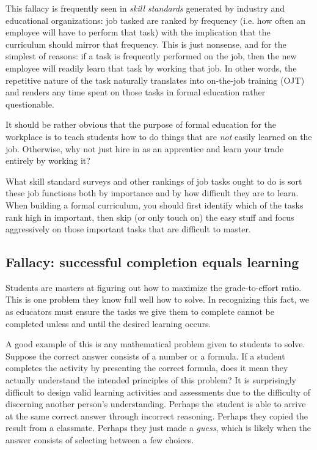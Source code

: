 This fallacy is frequently seen in \textit{skill standards} generated by industry and educational organizations: job tasked are ranked by frequency (i.e. how often an employee will have to perform that task) with the implication that the curriculum should mirror that frequency.  This is just nonsense, and for the simplest of reasons: if a task is frequently performed on the job, then the new employee will readily learn that task by working that job.  In other words, the repetitive nature of the task naturally translates into on-the-job training (OJT) and renders any time spent on those tasks in formal education rather questionable.    

It should be rather obvious that the purpose of formal education for the workplace is to teach students how to do things that are \textit{not} easily learned on the job.  Otherwise, why not just hire in as an apprentice and learn your trade entirely by working it?

\vskip 10pt

What skill standard surveys and other rankings of job tasks ought to do is sort these job functions both by importance and by how difficult they are to learn.  When building a formal curriculum, you should first identify which of the tasks rank high in important, then skip (or only touch on) the easy stuff and focus aggressively on those important tasks that are difficult to master.







\subsection{Fallacy: successful completion equals learning}

Students are masters at figuring out how to maximize the grade-to-effort ratio.  This is one problem they know full well how to solve.  In recognizing this fact, we as educators must ensure the tasks we give them to complete cannot be completed unless and until the desired learning occurs.

A good example of this is any mathematical problem given to students to solve.  Suppose the correct answer consists of a number or a formula.  If a student completes the activity by presenting the correct formula, does it mean they actually understand the intended principles of this problem?  It is surprisingly difficult to design valid learning activities and assessments due to the difficulty of discerning another person's understanding.  Perhaps the student is able to arrive at the same correct answer through incorrect reasoning.  Perhaps they copied the result from a classmate.  Perhaps they just made a \textit{guess}, which is likely when the answer consists of selecting between a few choices.






